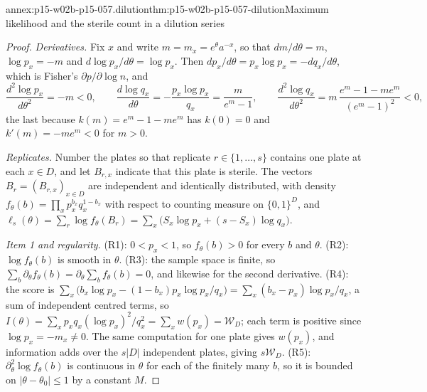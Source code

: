 \begin{annexitem}{annex:p15-w02b-p15-057.dilution}{thm:p15-w02b-p15-057-dilution}{Maximum likelihood and the sterile count in a dilution series}
\begin{proof}
\emph{Derivatives.} Fix \(x\) and write \(m=m_x=e^\theta a^{-x}\), so that
\(dm/d\theta=m\), \(\log p_x=-m\) and \(d\log p_x/d\theta=\log p_x\). Then
\(dp_x/d\theta=p_x\log p_x=-dq_x/d\theta\), which is Fisher's
\(\partial p/\partial\log n\), and
\[
 \frac{d^2\log p_x}{d\theta^2}=-m<0,\qquad
 \frac{d\log q_x}{d\theta}=-\frac{p_x\log p_x}{q_x}=\frac{m}{e^m-1},\qquad
 \frac{d^2\log q_x}{d\theta^2}
 =m\,\frac{e^m-1-me^m}{(e^m-1)^2}<0,
\]
the last because \(k(m)=e^m-1-me^m\) has \(k(0)=0\) and
\(k'(m)=-me^m<0\) for \(m>0\).

\emph{Replicates.} Number the plates so that replicate \(r\in\{1,\ldots,s\}\)
contains one plate at each \(x\in D\), and let \(B_{r,x}\) indicate that
this plate is sterile. The vectors \(B_r=(B_{r,x})_{x\in D}\) are
independent and identically distributed, with density
\(f_\theta(b)=\prod_xp_x^{b_x}q_x^{1-b_x}\) with respect to counting measure
on \(\{0,1\}^D\), and
\(\ell_s(\theta)=\sum_r\log f_\theta(B_r)=\sum_x\bigl(S_x\log p_x
+(s-S_x)\log q_x\bigr)\).

\emph{Item 1 and regularity.} (R1): \(0<p_x<1\), so \(f_\theta(b)>0\) for
every \(b\) and \(\theta\). (R2): \(\log f_\theta(b)\) is smooth in
\(\theta\). (R3): the sample space is finite, so \(\sum_b\partial_\theta
f_\theta(b)=\partial_\theta\sum_bf_\theta(b)=0\), and likewise for the
second derivative. (R4): the score is
\(\sum_x\bigl(b_x\log p_x-(1-b_x)p_x\log p_x/q_x\bigr)
=\sum_x(b_x-p_x)\log p_x/q_x\), a sum of independent centred terms, so
\(I(\theta)=\sum_xp_xq_x(\log p_x)^2/q_x^2=\sum_xw(p_x)=\mathcal W_D\);
each term is positive since \(\log p_x=-m_x\neq0\). The same computation
for one plate gives \(w(p_x)\), and information adds over the
\(s|D|\) independent plates, giving \(s\mathcal W_D\). (R5):
\(\partial_\theta^2\log f_\theta(b)\) is continuous in \(\theta\) for each
of the finitely many \(b\), so it is bounded on \(|\theta-\theta_0|\leq1\)
by a constant \(M\).


\end{proof}
\end{annexitem}
